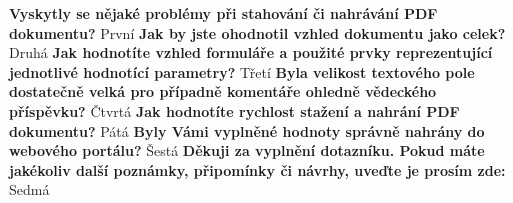 \textbf{Vyskytly se nějaké problémy při stahování či nahrávání PDF dokumentu?}
\newline
První
\newline
\newline
\textbf{Jak by jste ohodnotil vzhled dokumentu jako celek?}
\newline
Druhá
\newline
\newline
\textbf{Jak hodnotíte vzhled formuláře a použité prvky reprezentující jednotlivé hodnotící parametry?}
\newline
Třetí
\newline
\newline
\textbf{Byla velikost textového pole dostatečně velká pro případně komentáře ohledně vědeckého příspěvku?}
\newline
Čtvrtá
\newline
\newline
\textbf{Jak hodnotíte rychlost stažení a nahrání PDF dokumentu?} 
\newline
Pátá
\newline
\newline
\textbf{Byly Vámi vyplněné hodnoty správně nahrány do webového portálu?}
\newline
Šestá
\newline
\newline
\textbf{Děkuji za vyplnění dotazníku. Pokud máte jakékoliv další poznámky, připomínky či návrhy, uveďte je prosím zde:}
\newline
Sedmá
\newpage 
